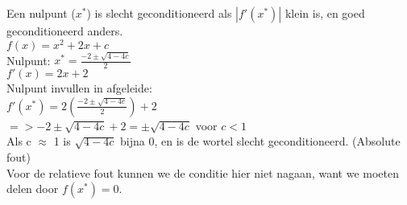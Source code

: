 Een nulpunt ($x^*$) is slecht geconditioneerd als $|f'(x^*)|$ klein is, en goed geconditioneerd anders.\\
$f(x) = x^2 + 2x + c$\\
Nulpunt: $x^* = \frac{-2 \pm \sqrt{4-4c}}{2}$\\
$f'(x) = 2x + 2$\\
Nulpunt invullen in afgeleide:\\
$f'(x^*) = 2(\frac{-2 \pm \sqrt{4-4c}}{2}) + 2$\\
$=> -2 \pm \sqrt{4-4c} + 2 = \pm \sqrt{4-4c}$ voor $c < 1$\\
Als c $\approx$ 1 is $\sqrt{4-4c}$ bijna 0, en is de wortel slecht geconditioneerd. (Absolute fout)\\
Voor de relatieve fout kunnen we de conditie hier niet nagaan, want we moeten delen door $f(x^*) = 0$.